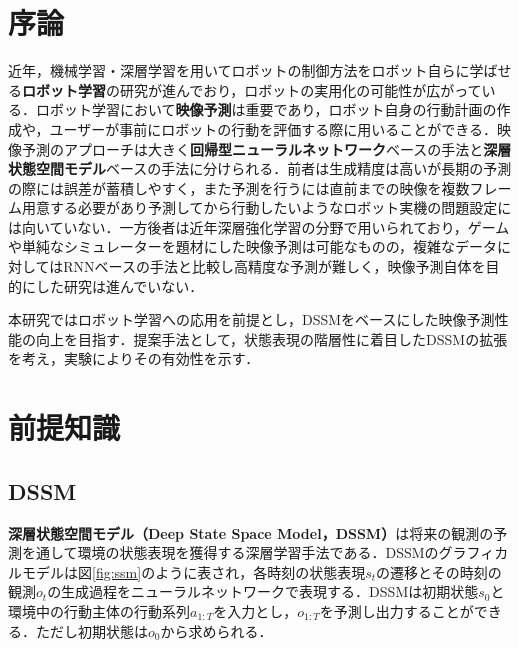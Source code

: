 \documentclass[10pt, twocolumn]{jarticle}
\begin{document}
%


\section{序論}

近年，機械学習・深層学習を用いてロボットの制御方法をロボット自らに学ばせる{\bf ロボット学習}の研究が進んでおり，ロボットの実用化の可能性が広がっている．ロボット学習において{\bf 映像予測}は重要であり，ロボット自身の行動計画の作成や\cite{hafner2019planet}，ユーザーが事前にロボットの行動を評価する際に用いることができる\cite{ebert2018visual}．映像予測のアプローチは大きく{\bf 回帰型ニューラルネットワーク}ベースの手法と{\bf 深層状態空間モデル}ベースの手法に分けられる．前者は生成精度は高いが長期の予測の際には誤差が蓄積しやすく，また予測を行うには直前までの映像を複数フレーム用意する必要があり予測してから行動したいようなロボット実機の問題設定には向いていない．一方後者は近年深層強化学習の分野で用いられており，ゲームや単純なシミュレーターを題材にした映像予測は可能なものの，複雑なデータに対してはRNNベースの手法と比較し高精度な予測が難しく，映像予測自体を目的にした研究は進んでいない．

本研究ではロボット学習への応用を前提とし，DSSMをベースにした映像予測性能の向上を目指す．提案手法として，状態表現の階層性に着目したDSSMの拡張を考え，実験によりその有効性を示す．

\section{前提知識}
\subsection{DSSM}
{\bf 深層状態空間モデル（Deep State Space Model，DSSM）}は将来の観測の予測を通して環境の状態表現を獲得する深層学習手法である\cite{krishnan2015deep}．DSSMのグラフィカルモデルは図\ref{fig:ssm}のように表され，各時刻の状態表現$s_t$の遷移とその時刻の観測$o_t$の生成過程をニューラルネットワークで表現する．DSSMは初期状態$s_0$と環境中の行動主体の行動系列$a_{1:T}$を入力とし，$o_{1:T}$を予測し出力することができる．ただし初期状態は$o_0$から求められる．
\end{document}
